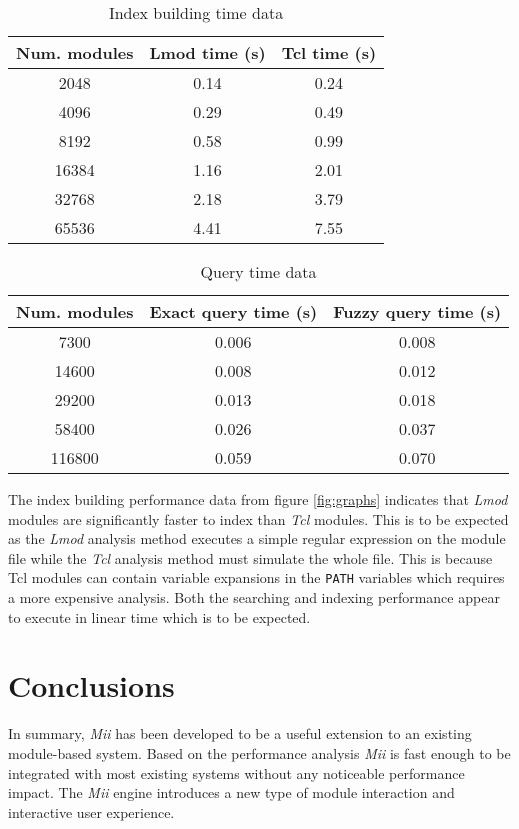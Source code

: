 \documentclass[manuscript,screen]{acmart}
\begin{document}
\begin{table}
  \begin{tabular}{ccc}
    \toprule
      Num. modules & Lmod time (s) & Tcl time (s) \\
    \midrule
      2048 & 0.14 & 0.24 \\
      4096 & 0.29 & 0.49 \\
      8192 & 0.58 & 0.99 \\
      16384 & 1.16 & 2.01 \\
      32768 & 2.18 & 3.79 \\
      65536 & 4.41 & 7.55 \\
  \bottomrule
\end{tabular}
  \caption{Index building time data}
  \label{tab:build}
\end{table}

\begin{table}
  \begin{tabular}{ccc}
    \toprule
      Num. modules & Exact query time (s) & Fuzzy query time (s) \\
    \midrule
      7300 & 0.006 & 0.008 \\
      14600 & 0.008 & 0.012 \\
      29200 & 0.013 & 0.018 \\
      58400 & 0.026 & 0.037 \\
      116800 & 0.059 & 0.070 \\
  \bottomrule
\end{tabular}
  \caption{Query time data}
  \label{tab:search}
\end{table}

The index building performance data from figure \ref{fig:graphs} indicates that \textit{Lmod} modules are significantly faster to
index than \textit{Tcl} modules. This is to be expected as the \textit{Lmod} analysis method executes a simple regular
expression on the module file while the \textit{Tcl} analysis method must simulate the whole file. This is because
Tcl modules can contain variable expansions in the \texttt{PATH} variables which requires a more expensive analysis.
Both the searching and indexing performance appear to execute in linear time which is to be expected.

\section{Conclusions}

In summary, \textit{Mii} has been developed to be a useful extension to an existing module-based system. Based
on the performance analysis \textit{Mii} is fast enough to be integrated with most existing systems without any
noticeable performance impact. The \textit{Mii} engine introduces a new type of module interaction and interactive
user experience.
\end{document}
